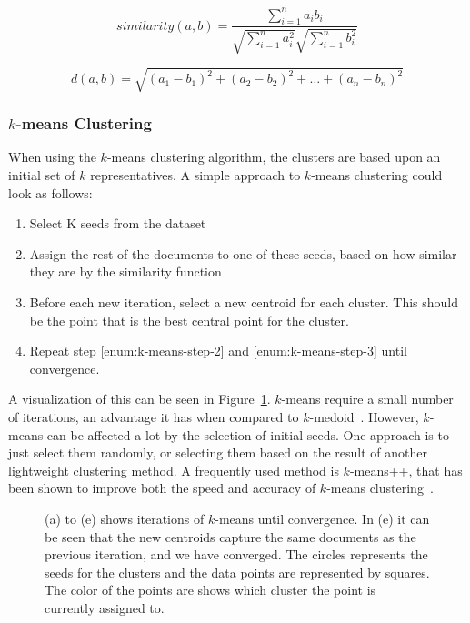 \begin{equation}\label{eq:cosine}
    similarity(a, b) = \frac{\sum_{i=1}^n a_i b_i}{\sqrt{\sum_{i=1}^n a_i^2}\sqrt{\sum_{i=1}^n b_i^2}}
\end{equation}

\begin{equation}\label{eq:euclidean}
    d(a, b) = \sqrt{(a_1 - b_1)^2 + (a_2 - b_2)^2 + \hdots + (a_n - b_n)^2}
\end{equation}

\subsubsection{$k$-means Clustering}\label{sec:k-mean}

When using the $k$-means clustering algorithm, the clusters are based upon an initial set of $k$ representatives.
A simple approach to $k$-means clustering could look as follows:

\begin{enumerate}
    \item Select K seeds from the dataset
    \item \label{enum:k-means-step-2} Assign the rest of the documents to one of these seeds, based on how similar they are by the similarity function
    \item \label{enum:k-means-step-3} Before each new iteration, select a new centroid for each cluster. This should be the point that is the best central point for the cluster.
    \item Repeat step \ref{enum:k-means-step-2} and \ref{enum:k-means-step-3} until convergence.
\end{enumerate}

A visualization of this can be seen in Figure~\ref{fig:kmeans-iterations}.
$k$-means require a small number of iterations, an advantage it has when compared to $k$-medoid~\cite{aggarwal2012survey, schutze1997projections}.
However, $k$-means can be affected a lot by the selection of initial seeds.
One approach is to just select them randomly, or selecting them based on the result of another lightweight clustering method.
A frequently used method is $k$-means++, that has been shown to improve both the speed and accuracy of $k$-means clustering~\cite{arthur2007k}.

\begin{figure}
    \centering
    \quad
    \caption{(a) to (e) shows iterations of $k$-means until convergence.
        In (e) it can be seen that the new centroids capture the same documents as the previous iteration, and we have converged.
        The circles represents the seeds for the clusters and the data points are represented by squares.
        The color of the points are shows which cluster the point is currently assigned to.}
    \label{fig:kmeans-iterations}
\end{figure}

